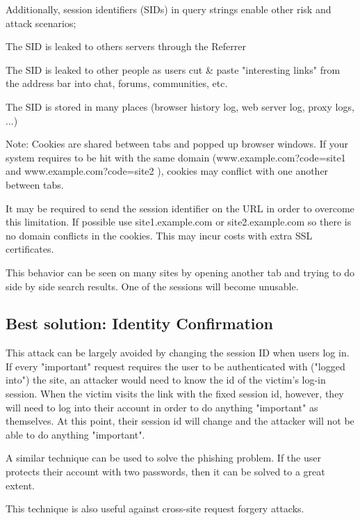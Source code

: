 Additionally, session identifiers (SIDs) in query strings enable other risk and attack scenarios;

\begin{compactitem}
\item The SID is leaked to others servers through the Referrer
\item The SID is leaked to other people as users cut \& paste "interesting links" from the address bar into chat, forums, communities, etc.
\item The SID is stored in many places (browser history log, web server log, proxy logs, ...)
\end{compactitem}


Note: Cookies are shared between tabs and popped up browser windows. If your system requires to be hit with the same domain (www.example.com?code=site1 and www.example.com?code=site2 ), cookies may conflict with one another between tabs.

It may be required to send the session identifier on the URL in order to overcome this limitation. If possible use site1.example.com or site2.example.com so there is no domain conflicts in the cookies. This may incur costs with extra SSL certificates.

This behavior can be seen on many sites by opening another tab and trying to do side by side search results. One of the sessions will become unusable.


\subsection{Best solution: Identity Confirmation}

This attack can be largely avoided by changing the session ID when users log in. If every "important" request requires the user to be authenticated with ("logged into") the site, an attacker would need to know the id of the victim's log-in session. When the victim visits the link with the fixed session id, however, they will need to log into their account in order to do anything "important" as themselves. At this point, their session id will change and the attacker will not be able to do anything "important".

A similar technique can be used to solve the phishing problem. If the user protects their account with two passwords, then it can be solved to a great extent.

This technique is also useful against cross-site request forgery attacks.




